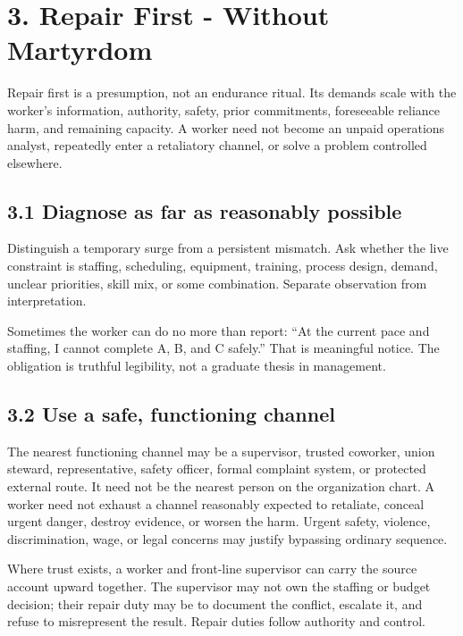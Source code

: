\documentclass[11pt,oneside]{article}
\begin{document}
\hypertarget{repair-first---without-martyrdom}{%
\section{3. Repair First - Without
Martyrdom}\label{repair-first---without-martyrdom}}

Repair first is a presumption, not an endurance ritual. Its demands
scale with the worker's information, authority, safety, prior
commitments, foreseeable reliance harm, and remaining capacity. A worker
need not become an unpaid operations analyst, repeatedly enter a
retaliatory channel, or solve a problem controlled elsewhere.

\hypertarget{diagnose-as-far-as-reasonably-possible}{%
\subsection{3.1 Diagnose as far as reasonably
possible}\label{diagnose-as-far-as-reasonably-possible}}

Distinguish a temporary surge from a persistent mismatch. Ask whether
the live constraint is staffing, scheduling, equipment, training,
process design, demand, unclear priorities, skill mix, or some
combination. Separate observation from interpretation.

Sometimes the worker can do no more than report: ``At the current pace
and staffing, I cannot complete A, B, and C safely.'' That is meaningful
notice. The obligation is truthful legibility, not a graduate thesis in
management.

\hypertarget{use-a-safe-functioning-channel}{%
\subsection{3.2 Use a safe, functioning
channel}\label{use-a-safe-functioning-channel}}

The nearest functioning channel may be a supervisor, trusted coworker,
union steward, representative, safety officer, formal complaint system,
or protected external route. It need not be the nearest person on the
organization chart. A worker need not exhaust a channel reasonably
expected to retaliate, conceal urgent danger, destroy evidence, or
worsen the harm. Urgent safety, violence, discrimination, wage, or legal
concerns may justify bypassing ordinary sequence.

Where trust exists, a worker and front-line supervisor can carry the
source account upward together. The supervisor may not own the staffing
or budget decision; their repair duty may be to document the conflict,
escalate it, and refuse to misrepresent the result. Repair duties follow
authority and control.
\end{document}
